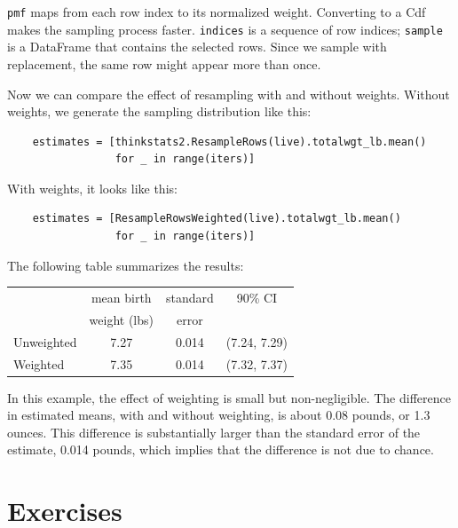 \documentclass[12pt]{book}
\begin{document}
{\tt pmf} maps from each row index to its normalized weight.  Converting
to a Cdf makes the sampling process faster.  {\tt indices} is a sequence
of row indices; {\tt sample} is a DataFrame that contains the selected
rows.  Since we sample with replacement, the same row might appear
more than once.

Now we can compare the effect of resampling with and without
weights.  Without weights, we generate the sampling distribution
like this:

\begin{verbatim}
    estimates = [thinkstats2.ResampleRows(live).totalwgt_lb.mean()
                 for _ in range(iters)]
\end{verbatim}

With weights, it looks like this:

\begin{verbatim}
    estimates = [ResampleRowsWeighted(live).totalwgt_lb.mean()
                 for _ in range(iters)]
\end{verbatim}

The following table summarizes the results:

\begin{center}
\begin{tabular}{|l|c|c|c|}
\hline
                    &  mean birth   & standard  &  90\% CI  \\ 
                    &  weight (lbs) & error     &           \\ 
\hline
Unweighted          &  7.27  &  0.014  &  (7.24, 7.29)  \\ 
Weighted            &  7.35  &  0.014  &  (7.32, 7.37)  \\ 
\hline
\end{tabular}
\end{center}


In this example, the effect of weighting is small but non-negligible.
The difference in estimated means, with and without weighting, is
about 0.08 pounds, or 1.3 ounces.  This difference is substantially
larger than the standard error of the estimate, 0.014 pounds, which
implies that the difference is not due to chance.


\section{Exercises}
\end{document}
